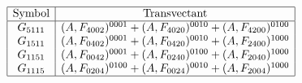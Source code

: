 \documentclass[a4paper,12pt,fleqn]{article}
\begin{document}
$\begin{array}{cc}%
\begin{array}{|c|c|}\hline
\mbox{Symbol}&\mbox{Transvectant}\\\hline
G_{5111}&(A,F_{4002})^{0001}+(A,F_{4020})^{0010}+(A,F_{4200})^{0100}\\
G_{1511}&(A,F_{0402})^{0001}+(A,F_{0420})^{0010}+(A,F_{2400})^{1000}\\
G_{1151}&(A,F_{0042})^{0001}+(A,F_{0240})^{0100}+(A,F_{2040})^{1000}\\
G_{1115}&(A,F_{0204})^{0100}+(A,F_{0024})^{0010}+(A,F_{2004})^{1000}\\\hline
\end{array}\end{array}\nonumber\nonumber
$\medskip
\end{document}
